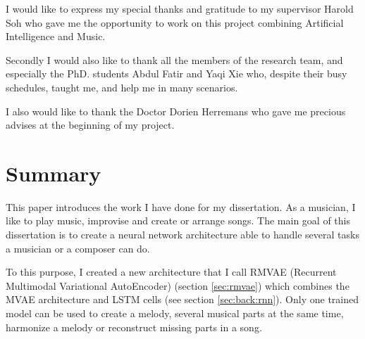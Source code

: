 \documentclass[12pt]{report}
\begin{document}
I would like to express my special thanks and gratitude to my supervisor Harold Soh who gave me the opportunity to work on this project combining Artificial Intelligence and Music.

Secondly I would also like to thank all the members of the research team, and especially the PhD. students Abdul Fatir and Yaqi Xie who, despite their busy schedules, taught me, and help me in many scenarios.

I also would like to thank the Doctor Dorien Herremans who gave me precious advises at the beginning of my project.

\newpage
\tableofcontents
\newpage


\setlength{\parindent}{0.6cm}


\chapter*{Summary}

This paper introduces the work I have done for my dissertation.
As a musician, I like to play music, improvise and create or arrange songs.
The main goal of this dissertation is to create a neural network architecture able to handle several tasks a musician or a composer can do.

To this purpose, I created a new architecture that I call RMVAE (Recurrent Multimodal Variational AutoEncoder) (section \ref{sec:rmvae}) which combines the MVAE architecture \cite{wu_multimodal_2018} and LSTM cells (see section \ref{sec:back:rnn}).
Only one trained model can be used to create a melody, several musical parts at the same time, harmonize a melody or reconstruct missing parts in a song.
\end{document}
